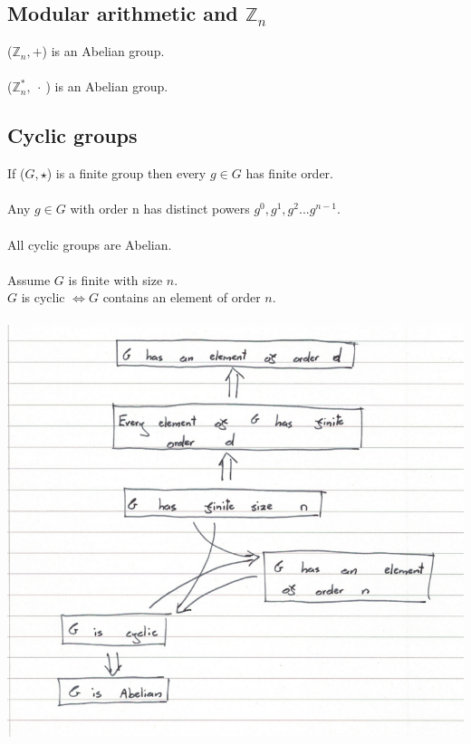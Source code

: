 \documentclass{scrartcl}
\newcommand{\Z}{\mathbb{Z}}
\begin{document}
\subsection{Modular arithmetic and $ \Z_{n} $}
($ \Z_{n}, + $) is an Abelian group.
\\\\
($ \Z_{n}^{*}, \ \cdot \ $) is an Abelian group.

\subsection{Cyclic groups}
If ($ G, \star $) is a finite group then every $ g \in G $ has finite order.
\\\\
Any $ g \in G $ with order n has distinct powers $ g^{0}, g^{1}, g^{2}...g^{n - 1} $.
\\\\
All cyclic groups are Abelian.
\\\\
Assume $ G $ is finite with size $ n $. \\
$ G $ is cyclic $ \Leftrightarrow G $ contains an element of order $ n $.
\\\\
\includegraphics[scale=0.45]{cyclic_groups}
\end{document}
